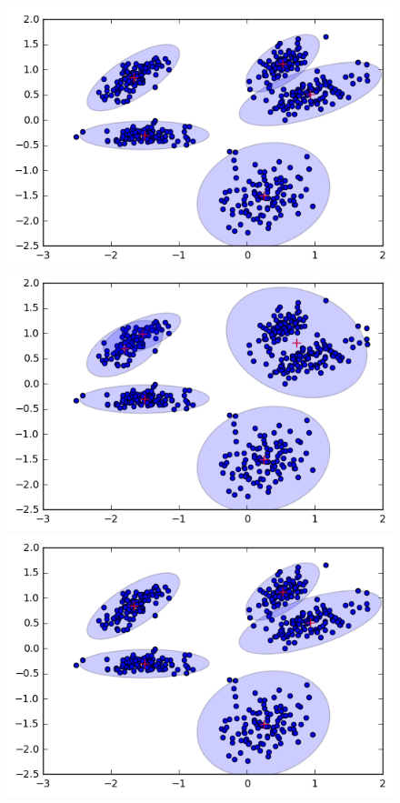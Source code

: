 \documentclass[a4paper,11pt]{article}
\begin{document}
\begin{figure}[htbp]
  \includegraphics[scale=0.17]{em7.png}
  \includegraphics[scale=0.17]{em8.png}
  \includegraphics[scale=0.17]{em9.png}

\end{figure}
\end{document}
